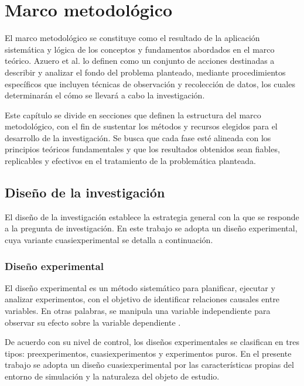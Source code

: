 \chapter{Marco metodológico}

El marco metodológico se constituye como el resultado de la aplicación sistemática y lógica de los conceptos y fundamentos abordados en el marco teórico. Azuero et al. \cite{azuero2019_metodologico} lo definen como un conjunto de acciones destinadas a describir y analizar el fondo del problema planteado, mediante procedimientos específicos que incluyen técnicas de observación y recolección de datos, los cuales determinarán el cómo se llevará a cabo la investigación. 

Este capítulo se divide en secciones que definen la estructura del marco metodológico, con el fin de sustentar los métodos y recursos elegidos para el desarrollo de la investigación. Se busca que cada fase esté alineada con los principios teóricos fundamentales y que los resultados obtenidos sean fiables, replicables y efectivos en el tratamiento de la problemática planteada.

\section{Diseño de la investigación}

El diseño de la investigación establece la estrategia general con la que se responde a la pregunta de investigación. En este trabajo se adopta un diseño experimental, cuya variante cuasiexperimental se detalla a continuación.

\subsection{Diseño experimental}

El diseño experimental es un método sistemático para planificar, ejecutar y analizar experimentos, con el objetivo de identificar relaciones causales entre variables. En otras palabras, se manipula una variable independiente para observar su efecto sobre la variable dependiente \cite{unam2025_experimental}.

De acuerdo con su nivel de control, los diseños experimentales se clasifican en tres tipos: preexperimentos, cuasiexperimentos y experimentos puros. En el presente trabajo se adopta un diseño cuasiexperimental por las características propias del entorno de simulación y la naturaleza del objeto de estudio.

